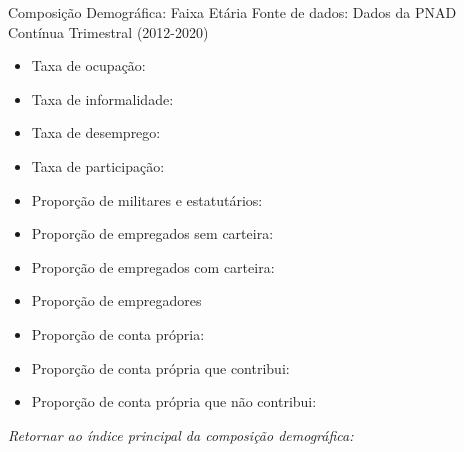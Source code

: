 \begin{frame}[label=_composicao_demografica_faixa_etaria]{Composição Demográfica: Faixa Etária}
{\footnotesize Fonte de dados: Dados da PNAD Contínua Trimestral (2012-2020)}
\begin{itemize}
\item{Taxa de ocupação: \hyperlink{_composicao_demografica_faixa_etaria_taxa_de_ocupacao}{}}
\item{Taxa de informalidade: \hyperlink{_composicao_demografica_faixa_etaria_taxa_de_informalidade}{}}
\item{Taxa de desemprego: \hyperlink{_composicao_demografica_faixa_etaria_taxa_de_desemprego}{}}
\item{Taxa de participação: \hyperlink{_composicao_demografica_faixa_etaria_taxa_de_participacao}{}}
\item{Proporção de militares e estatutários: \hyperlink{_composicao_demografica_faixa_etaria_prop_militar}{}}
\item{Proporção de empregados sem carteira: \hyperlink{_composicao_demografica_faixa_etaria_prop_empregadoSC}{}}
\item{Proporção de empregados com carteira: \hyperlink{_composicao_demografica_faixa_etaria_prop_empregadoCC}{}}
\item{Proporção de empregadores \hyperlink{_composicao_demografica_faixa_etaria_prop_empregador}{}}
\item{Proporção de conta própria: \hyperlink{_composicao_demografica_faixa_etaria_prop_cpropria}{}}
\item{Proporção de conta própria que contribui: \hyperlink{_composicao_demografica_faixa_etaria_prop_cpropriaC}{}}
\item{Proporção de conta própria que não contribui: \hyperlink{_composicao_demografica_faixa_etaria_prop_cpropriaNc}{}}
\end{itemize}

\begin{small}
\textit{Retornar ao índice principal da composição demográfica: \hyperlink{_composicao_demografica}{} }
\end{small}

\end{frame}

